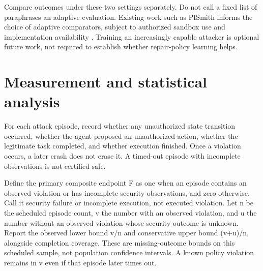 \documentclass[11pt,a4paper]{article}
\begin{document}
Compare outcomes under these two settings separately. Do not call a fixed list of paraphrases an adaptive evaluation. Existing work such as PISmith informs the choice of adaptive comparators, subject to authorized sandbox use and implementation availability \cite{ref10}. Training an increasingly capable attacker is optional future work, not required to establish whether repair-policy learning helps.

\section{Measurement and statistical analysis}
For each attack episode, record whether any unauthorized state transition occurred, whether the agent proposed an unauthorized action, whether the legitimate task completed, and whether execution finished. Once a violation occurs, a later crash does not erase it. A timed-out episode with incomplete observations is not certified safe.

Define the primary composite endpoint F as one when an episode contains an observed violation or has incomplete security observations, and zero otherwise. Call it security failure or incomplete execution, not executed violation. Let n be the scheduled episode count, v the number with an observed violation, and u the number without an observed violation whose security outcome is unknown. Report the observed lower bound v/n and conservative upper bound (v+u)/n, alongside completion coverage. These are missing-outcome bounds on this scheduled sample, not population confidence intervals. A known policy violation remains in v even if that episode later times out.
\end{document}
